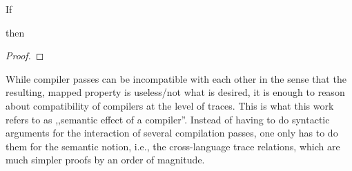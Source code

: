 \documentclass[a4paper,12pt]{article}
\begin{document}
\begin{lemma}{}
  If 
  \begin{assumptions}
  \end{assumptions}
  then
  \begin{goals}
  \end{goals}
\end{lemma}
\begin{proof}
  \incompleteProof
\end{proof}

While compiler passes can be incompatible with each other in the sense that the resulting, mapped property is useless/not what is desired, it is enough to reason about compatibility of compilers at the level of traces.
This is what this work refers to as ,,semantic effect of a compiler''.
Instead of having to do syntactic arguments for the interaction of several compilation passes, one only has to do them for the semantic notion, i.e., the cross-language trace relations, which are much simpler proofs by an order of magnitude. 


\clearpage



\printglossary
\end{document}
